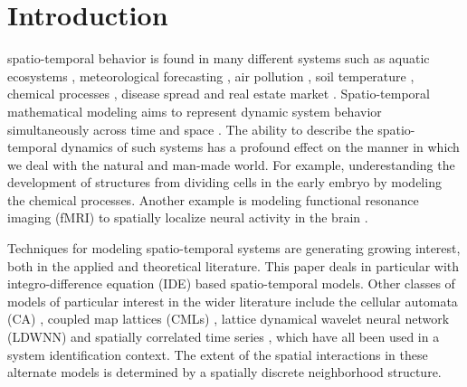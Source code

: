 \documentclass[10pt,twocolumn,twoside]{IEEEtran}
\begin{document}
%
\IEEEpeerreviewmaketitle



\section{Introduction}
 spatio-temporal behavior is found in many different systems such as aquatic ecosystems \cite{Schofield2002}, meteorological forecasting \cite{Xu2005}, air pollution \cite{Romanowicz2006}, soil temperature  \cite{Bond-Lamberty2005}, chemical processes \cite{Deng2005}, disease spread \cite{Kuo2009} and real estate market \cite{Pace2000,Sun2005}. Spatio-temporal mathematical modeling aims to represent dynamic system behavior simultaneously across time and space \cite{Cressie2011}. The ability to describe the spatio-temporal dynamics of such systems has a profound effect on the manner in which we deal with the natural and man-made world. For example, underestanding the development of structures from dividing cells in the early embryo by modeling the chemical processes\cite{Maini1997}. Another example is modeling functional resonance imaging (fMRI) to spatially localize neural activity in the brain \cite{Woolrich2004}. 

Techniques for modeling spatio-temporal systems are generating growing interest, both in the applied and theoretical literature. This paper deals in particular with integro-difference equation (IDE) based spatio-temporal models. Other classes of models of particular interest in the wider literature include the cellular automata (CA) \cite{Wolfram1994}, coupled map lattices (CMLs) \cite{Billings2002}, lattice dynamical wavelet neural network (LDWNN) \cite{Wei2009} and spatially correlated time series \cite{Pfeifer1980,Glasbey2008,Dewar2007}, which have all been used in a system identification context. The extent of the spatial interactions in these alternate models is determined by a spatially discrete neighborhood structure.
\end{document}
